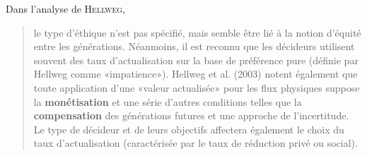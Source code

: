 Dans l'analyse de \textsc{Hellweg},
\blockcquote[traduction]{murray_transdisciplinary_2015}{
le type d'éthique n'est pas spécifié, mais semble être lié à la notion d'équité entre les générations.
Néanmoins, il est reconnu que les décideurs utilisent souvent des taux d'actualisation sur la base de préférence pure (définie par Hellweg comme «impatience»).
Hellweg et al. (2003) notent également que toute application d'une «valeur actualisée» pour les flux physiques suppose la \textbf{monétisation} et une série d'autres conditions telles que la \textbf{compensation} des générations futures et une approche de l'incertitude.
Le type de décideur et de leurs objectifs affectera également le choix du taux d'actualisation
(caractérisée par le taux de réduction privé ou social).
}


